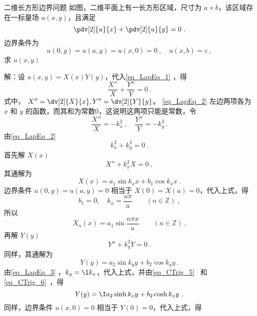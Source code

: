 \begin{example}{二维长方形边界问题}
如图，二维平面上有一长方形区域，尺寸为 $a\times b$，该区域存在一标量场 $u(x,y)$，且满足
\begin{equation}\label{eq_LapEq_1}
\pdv[2]{u}{x}+\pdv[2]{u}{y}=0~.
\end{equation}
边界条件为
\begin{equation}
u(0,y)=u(a,y)=u(x,0)=0~,\quad u(x,b)=c~,
\end{equation}
求 $u(x,y)$

解：设 $u(x,y)=X(x)Y(y)$，代入\autoref{eq_LapEq_1} ，得
\begin{equation}\label{eq_LapEq_2}
\frac{X''}{X}+\frac{Y''}{Y}=0~.
\end{equation}
式中， $X''=\dv[2]{X}{x},Y''=\dv[2]{Y}{y}$。
\autoref{eq_LapEq_2} 左边两项各为 $x$ 和 $y$ 的函数，而其和为常数0，这说明这两项只能是常数，令
\begin{equation}
\frac{X''}{X}=-k_x^2~,\quad \frac{Y''}{Y}=-k_y^2~.
\end{equation}
由\autoref{eq_LapEq_2} 
\begin{equation}\label{eq_LapEq_3}
k_x^2+k_y^2=0~.
\end{equation}
首先解 $X(x)$
\begin{equation}
X''+k_x^2X=0~,
\end{equation}
其通解为
\begin{equation}
X(x)=a_1\sin k_x x+b_1\cos k_x x~.
\end{equation}
边界条件 $u(0,y)=u(a,y)=0$ 相当于 $X(0)=X(a)=0$，代入上式，得
\begin{equation}
b_1=0,\quad k_x=\frac{n\pi}{a} \qquad (n\in \mathbb{Z})~,
\end{equation}
所以
\begin{equation}
X_n(x)=a_1\sin\frac{n\pi x}{a} \qquad (n\in \mathbb{Z})~.
\end{equation}
再解 $Y(y)$
\begin{equation}
Y''+k_y^2Y=0~.
\end{equation}
同样，其通解为
\begin{equation}
Y(y)=a_2\sin k_y y+b_2\cos k_y y~.
\end{equation}
由\autoref{eq_LapEq_3} ，$k_y=\I k_x$，代入上式，并由\autoref{eq_CTrig_5}~ 和\autoref{eq_CTrig_6}~，得
\begin{equation}
Y(y)=\I a_2\sinh k_x y+b_2\cosh k_x y~.
\end{equation}
同样，边界条件 $u(x,0)=0$ 相当于 $Y(0)=0$，代入上式，得
\begin{equation}

\end{equation}
\end{example}
